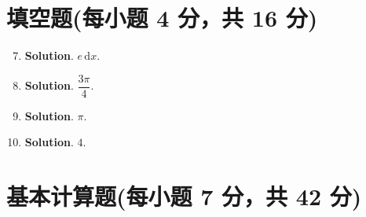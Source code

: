 \documentclass[../Main.tex]{subfiles}
\begin{document}
\section{填空题(每小题 4 分，共 16 分)}
\begin{enumerate}
    \setcounter{enumi}{6}
    \item \textbf{Solution}. $e\,\mathrm{d}x$.
    \item \textbf{Solution}. $\dfrac{3\pi}{4}$.
    \item \textbf{Solution}. $\pi$.
    \item \textbf{Solution}. $4$.
\end{enumerate}

\section{基本计算题(每小题 7 分，共 42 分)}
\end{document}
